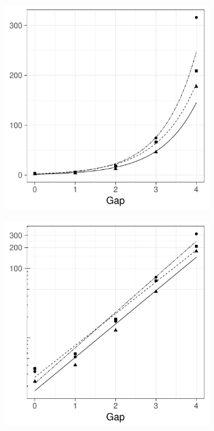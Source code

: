 \begin{figure}[htbp]
    \begin{subfigure}[b]{0.49\textwidth}
        \includegraphics[width=\textwidth]{results/by_pop_risk_distance/NMISE-vs-population-risk-gap}
        \caption{}
        \label{fig:ise:p1.4_100_Gap_risk:nmise}
    \end{subfigure}
    \begin{subfigure}[b]{0.49\textwidth}
        \includegraphics[width=\textwidth]{results/by_pop_risk_distance/NMISE-vs-population-risk-gap-log-log}

\end{subfigure}
\end{figure}
